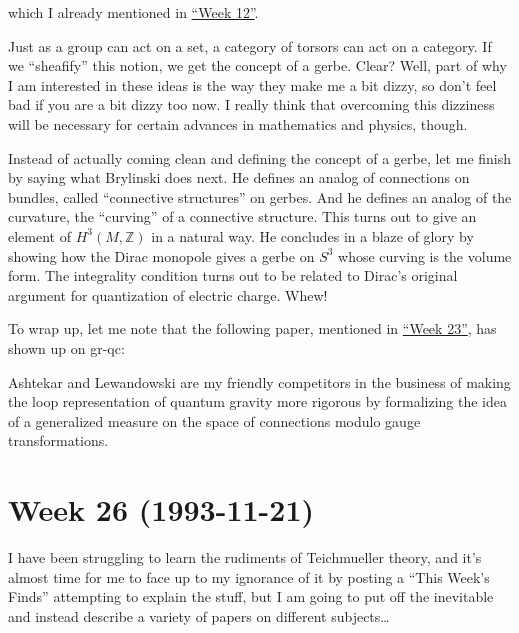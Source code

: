 \documentclass{article}
\def\tightlist{}
\renewcommand{\texttt}[1]{%
  \begingroup
  \ttfamily
  \begingroup\lccode`~=`/\lowercase{\endgroup\def~}{/\discretionary{}{}{}}%
  \begingroup\lccode`~=`[\lowercase{\endgroup\def~}{[\discretionary{}{}{}}%
  \begingroup\lccode`~=`.\lowercase{\endgroup\def~}{.\discretionary{}{}{}}%
  \catcode`/=\active\catcode`[=\active\catcode`.=\active
  \scantokens{#1\noexpand}%
  \endgroup
}
\begin{document}
which I already mentioned in \protect\hyperlink{week12}{``Week 12''}.

Just as a group can act on a set, a category of torsors can act on a
category. If we ``sheafify'' this notion, we get the concept of a gerbe.
Clear? Well, part of why I am interested in these ideas is the way they
make me a bit dizzy, so don't feel bad if you are a bit dizzy too now. I
really think that overcoming this dizziness will be necessary for
certain advances in mathematics and physics, though.

Instead of actually coming clean and defining the concept of a gerbe,
let me finish by saying what Brylinski does next. He defines an analog
of connections on bundles, called ``connective structures'' on gerbes.
And he defines an analog of the curvature, the ``curving'' of a
connective structure. This turns out to give an element of
\(H^3(M,\mathbb{Z})\) in a natural way. He concludes in a blaze of glory
by showing how the Dirac monopole gives a gerbe on \(S^3\) whose curving
is the volume form. The integrality condition turns out to be related to
Dirac's original argument for quantization of electric charge. Whew!

To wrap up, let me note that the following paper, mentioned in
\protect\hyperlink{week23}{``Week 23''}, has shown up on gr-qc:


Ashtekar and Lewandowski are my friendly competitors in the business of
making the loop representation of quantum gravity more rigorous by
formalizing the idea of a generalized measure on the space of
connections modulo gauge transformations.
\hypertarget{week26}{%
\section{Week 26 (1993-11-21)}\label{week26}}

I have been struggling to learn the rudiments of Teichmueller theory,
and it's almost time for me to face up to my ignorance of it by posting
a ``This Week's Finds'' attempting to explain the stuff, but I am going
to put off the inevitable and instead describe a variety of papers on
different subjects\ldots{}
\end{document}
